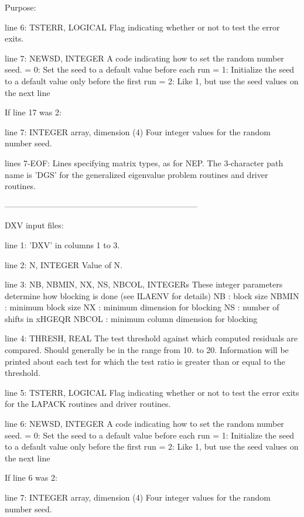 \begin{DoxyParagraph}{Purpose\+: }
\begin{DoxyVerb}
 line 6:  TSTERR, LOGICAL
          Flag indicating whether or not to test the error exits.

 line 7:  NEWSD, INTEGER
          A code indicating how to set the random number seed.
          = 0:  Set the seed to a default value before each run
          = 1:  Initialize the seed to a default value only before the
                first run
          = 2:  Like 1, but use the seed values on the next line

 If line 17 was 2:

 line 7:  INTEGER array, dimension (4)
          Four integer values for the random number seed.

 lines 7-EOF:  Lines specifying matrix types, as for NEP.
          The 3-character path name is 'DGS' for the generalized
          eigenvalue problem routines and driver routines.

-----------------------------------------------------------------------

 DXV input files:

 line 1:  'DXV' in columns 1 to 3.

 line 2:  N, INTEGER
          Value of N.

 line 3:  NB, NBMIN, NX, NS, NBCOL, INTEGERs
          These integer parameters determine how blocking is done
          (see ILAENV for details)
          NB     : block size
          NBMIN  : minimum block size
          NX     : minimum dimension for blocking
          NS     : number of shifts in xHGEQR
          NBCOL  : minimum column dimension for blocking

 line 4:  THRESH, REAL
          The test threshold against which computed residuals are
          compared. Should generally be in the range from 10. to 20.
          Information will be printed about each test for which the
          test ratio is greater than or equal to the threshold.

 line 5:  TSTERR, LOGICAL
          Flag indicating whether or not to test the error exits for
          the LAPACK routines and driver routines.

 line 6:  NEWSD, INTEGER
          A code indicating how to set the random number seed.
          = 0:  Set the seed to a default value before each run
          = 1:  Initialize the seed to a default value only before the
                first run
          = 2:  Like 1, but use the seed values on the next line

 If line 6 was 2:

 line 7: INTEGER array, dimension (4)
          Four integer values for the random number seed.


\end{DoxyVerb}
\end{DoxyParagraph}
